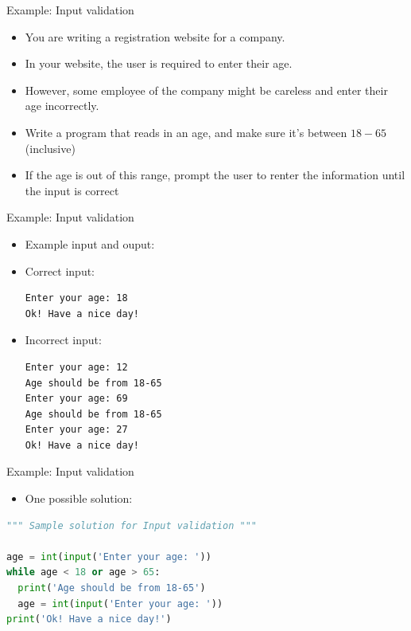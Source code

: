 \documentclass[10pt,xcolor={table,dvipsnames},t]{beamer}
\begin{document}
\begin{frame}{Example: Input validation}
  \begin{itemize}
    \item You are writing a registration website for a company. 
    \item In your website, the user is required to enter their age. 
    \item However, some employee of the company might be careless and enter their age incorrectly.
    \item Write a program that reads in an age, and make sure it's between $18-65$ (inclusive)
    \item If the age is out of this range, prompt the user to renter the information until the input is correct
  \end{itemize}
\end{frame}

\begin{frame}[fragile]{Example: Input validation}
  \begin{itemize}
    \item Example input and ouput:
    \item Correct input:
\begin{lstlisting}
Enter your age: 18
Ok! Have a nice day!
\end{lstlisting}
  \item Incorrect input:
\begin{lstlisting}
Enter your age: 12
Age should be from 18-65
Enter your age: 69
Age should be from 18-65
Enter your age: 27
Ok! Have a nice day!
\end{lstlisting}
  \end{itemize}

\end{frame}

\begin{frame}[fragile]{Example: Input validation}
\begin{itemize}
  \item One possible solution:
\end{itemize}
\begin{lstlisting}[language=python]
""" Sample solution for Input validation """

age = int(input('Enter your age: '))
while age < 18 or age > 65:
  print('Age should be from 18-65')
  age = int(input('Enter your age: '))
print('Ok! Have a nice day!')
\end{lstlisting}
\end{frame}
\end{document}
